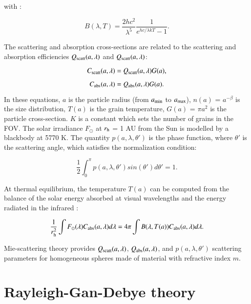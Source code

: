 \documentclass[a4paper,fleqn,usenatbib]{mnras}
\begin{document}
\noindent
with :

\begin{equation}
B(\lambda,T) = \frac{2 h c^2}{\lambda ^5} \frac{1}{e^{h c/\lambda k T}-1}.
\end{equation}

\noindent
The scattering and absorption cross-sections are related to the scattering and absorption efficiencies $Q_{\rm scatt}(a,\lambda)$ and $Q_{\rm scatt}(a,\lambda)$:


\begin{equation}
C_{\rm scatt}(a,\lambda) = Q_{\rm scatt}(a,\lambda)G(a),
\end{equation}

\begin{equation}
C_{\rm abs}(a,\lambda) = Q_{\rm abs}(a,\lambda)G(a).
\end{equation}

In these equations, $a$ is the particle radius (from $a_{\rm min}$ to $a_{\rm max}$), $n(a)$ = $a^{-\beta}$ is the size distribution, $T(a)$ is the grain temperature, $G(a)$ = $\pi a^2$ is the particle cross-section. $K$ is a constant which sets the number of grains in the FOV. The solar irradiance $F_{\odot}$ at $r_{\rm h}$ = 1 AU from the Sun is modelled by a blackbody at 5770 K. The quantity $p(a,\lambda,\theta')$
is the phase function, where $\theta'$ is the scattering angle, which satisfies the normalization condition:

\begin{equation}
\frac{1}{2} \int_{0}^{\pi}p(a,\lambda,\theta') sin(\theta') d\theta' = 1.
\end{equation}

At thermal equilibrium, the temperature $T(a)$ can be computed from the balance of the solar energy absorbed at visual wavelengths and the energy radiated in the infrared \citep{Kolokolova2004}:

\begin{equation}\label{eq:tdust}
\frac{1}{r_{\rm h}^2} \int F_{\odot}(\lambda) C_{\rm abs}(a,\lambda) d\lambda = 4 \pi \int B(\lambda,T(a)) C_{\rm abs}(a,\lambda) d\lambda.
\end{equation}


Mie-scattering theory provides $Q_{\rm scatt}(a,\lambda)$, $Q_{\rm abs}(a,\lambda)$, and $p(a,\lambda,\theta')$
scattering parameters for homogeneous spheres made of material with refractive index $m$.


\section{Rayleigh-Gan-Debye theory}
\end{document}
